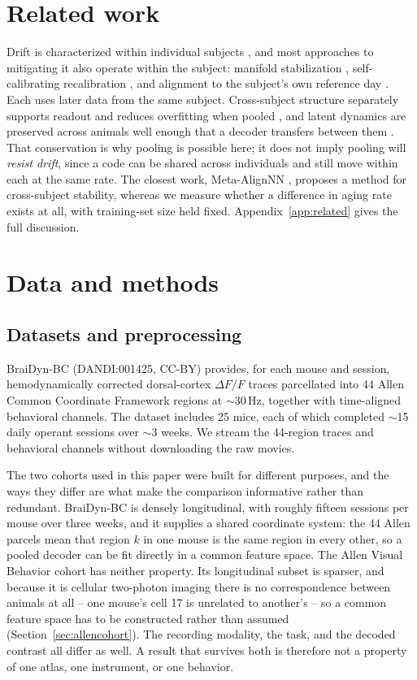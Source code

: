 \documentclass[mlmain,onecolumn]{jmlr}
\begin{document}
\section{Related work}
Drift is characterized within individual subjects
\citep{rule2020,driscoll2017,schoonover2021,rule2019}, and most approaches to mitigating it also
operate within the subject: manifold stabilization \citep{degenhart2020}, self-calibrating
recalibration \citep{jarosiewicz2015,wilson2025}, and alignment to the subject's own reference day
\citep{farshchian2019,karpowicz2025}. Each uses later data from the same subject. Cross-subject
structure separately supports readout \citep{melbaum2022,schneider2023,wicat2026} and reduces
overfitting when pooled \citep{peterson2021,neds2025}, and latent dynamics are preserved across
animals well enough that a decoder transfers between them \citep{safaie2023}. That conservation is
why pooling is possible here; it does not imply pooling will \emph{resist drift}, since a code can be
shared across individuals and still move within each at the same rate. The closest work,
Meta-AlignNN \citep{metaalign2025}, proposes a method for cross-subject stability, whereas we measure
whether a difference in aging rate exists at all, with training-set size held fixed.
Appendix~\ref{app:related} gives the full discussion.

\section{Data and methods}
\subsection{Datasets and preprocessing}
BraiDyn-BC \citep{kondo2025} (DANDI:001425, CC-BY) provides, for each mouse and
session, hemodynamically corrected dorsal-cortex $\Delta F/F$ traces parcellated into 44 Allen Common
Coordinate Framework regions at $\sim$30\,Hz, together with time-aligned behavioral channels. The
dataset includes 25 mice, each of which completed $\sim$15 daily operant sessions over $\sim$3 weeks.
We stream the 44-region traces and behavioral channels without downloading the raw movies.

The two cohorts used in this paper were built for different purposes, and the ways they differ are
what make the comparison informative rather than redundant. BraiDyn-BC is densely longitudinal, with
roughly fifteen sessions per mouse over three weeks, and it supplies a shared coordinate system: the
44 Allen parcels mean that region $k$ in one mouse is the same region in every other, so a pooled
decoder can be fit directly in a common feature space. The Allen Visual Behavior cohort has neither
property. Its longitudinal subset is sparser, and because it is cellular two-photon imaging there is
no correspondence between animals at all -- one mouse's cell 17 is unrelated to another's -- so a
common feature space has to be constructed rather than assumed (Section~\ref{sec:allencohort}). The
recording modality, the task, and the decoded contrast all differ as well. A result that survives
both is therefore not a property of one atlas, one instrument, or one behavior.
\end{document}
